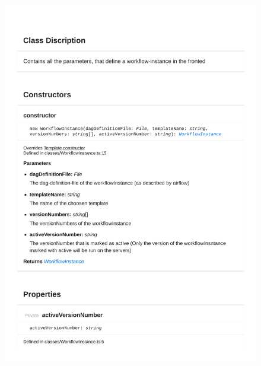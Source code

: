 \begin{figure}[H]
\centerline{\includegraphics[width=1\textwidth]{FrontendDocsAsPDF/Classes/WorkflowInstance.pdf}}
\end{figure}
